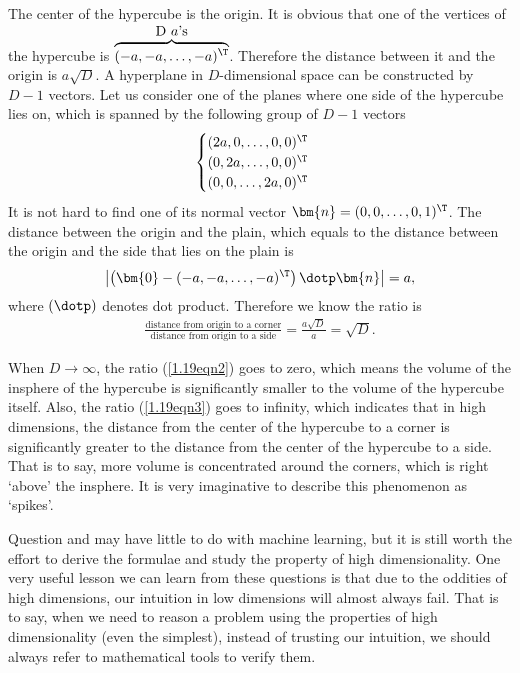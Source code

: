 \begin{answer}{}
	The center of the hypercube is the origin. It is obvious that one of the vertices of the hypercube is $\overbrace{(-a, -a, \ldots, -a)^{\T}}^{\mbox{D $a$'s}}$. Therefore the distance between it and the origin is $a\sqrt{D}$. A hyperplane in $D$-dimensional space can be constructed by $D-1$ vectors. Let us consider one of the planes where one side of the hypercube lies on, which is spanned by the following group of $D - 1$ vectors
	\begin{equation}
		\begin{cases}
			(2a, 0, \ldots, 0, 0)^{\T}\\
			(0, 2a, \ldots, 0, 0)^{\T}\\
			(0, 0, \ldots, 2a, 0)^{\T}
		\end{cases}
	\end{equation}
	It is not hard to find one of its normal vector $\bm{n} = (0, 0, \ldots, 0, 1)^{\T}$. The distance between the origin and the plain, which equals to the distance between the origin and the side that lies on the plain is
	\begin{align}
	\left\lvert \left(\bm{0} - (-a, -a, \ldots, -a)^{\T}\right) \dotp \bm{n} \right\rvert = a,
	\end{align}
	where $(\dotp)$ denotes dot product. Therefore we know the ratio is
	\begin{align}\label{1.19eqn3}
		\frac{\mbox{distance from origin to a corner}}{\mbox{distance from origin to a side}} = \frac{a\sqrt{D}}{a} = \sqrt{D}.
	\end{align}
	
	When $D \rightarrow \infty$, the ratio (\ref{1.19eqn2}) goes to zero, which means the volume of the insphere of the hypercube is significantly smaller to the volume of the hypercube itself. Also, the ratio (\ref{1.19eqn3}) goes to infinity, which indicates that in high dimensions, the distance from the center of the hypercube to a corner is significantly greater to the distance from the center of the hypercube to a side. That is to say, more volume is concentrated around the corners, which is right `above' the insphere. It is very imaginative to describe this phenomenon as `spikes'. 
	
	Question  and  may have little to do with machine learning, but it is still worth the effort to derive the formulae and study the property of high dimensionality. One very useful lesson we can learn from these questions is that due to the oddities of high dimensions, our intuition in low dimensions will almost always fail. That is to say, when we need to reason a problem using the properties of high dimensionality (even the simplest), instead of trusting our intuition, we should always refer to mathematical tools to verify them.
\end{answer}